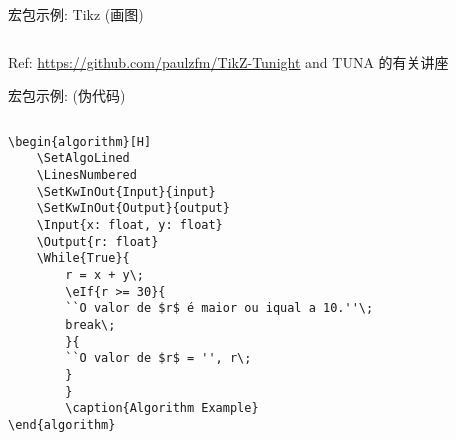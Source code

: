 \begin{frame}[fragile]{宏包示例: Tikz (画图)}
\begin{columns}
\begin{column}{.35\textwidth}
  
  \end{column}
\end{columns}

\vspace{-10pt}        
Ref: \url{https://github.com/paulzfm/TikZ-Tunight} and TUNA 的有关讲座
    
\end{frame}

\begin{frame}[fragile]{宏包示例:  (伪代码)}
    \begin{columns}
    \begin{column}{.6\textwidth}
        \lstset{language=[LaTeX]TeX}
    \begin{lstlisting}[basicstyle=\ttfamily\footnotesize]
\begin{algorithm}[H]
    \SetAlgoLined
    \LinesNumbered
    \SetKwInOut{Input}{input}
    \SetKwInOut{Output}{output}
    \Input{x: float, y: float}
    \Output{r: float}
    \While{True}{
        r = x + y\;
        \eIf{r >= 30}{
        ``O valor de $r$ é maior ou iqual a 10.''\;
        break\;
        }{
        ``O valor de $r$ = '', r\;
        }
        } 
        \caption{Algorithm Example}
\end{algorithm}
    \end{lstlisting}
    \end{column}
    \begin{column}{.4\textwidth}
        \begin{algorithm}[H]
            \SetAlgoLined
            \LinesNumbered
             \caption{Algorithm Example}
        \end{algorithm}
    \end{column}
    \end{columns}
\end{frame}